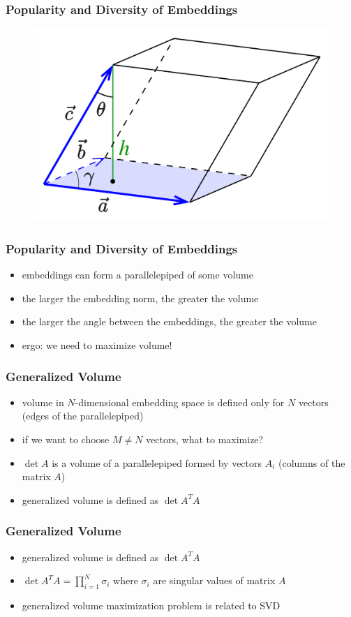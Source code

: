 \documentclass[t]{beamer}
\begin{document}
\begin{frame}
  \frametitle{Popularity and Diversity of Embeddings}
\begin{figure}
\includegraphics[scale=0.2]{parallelepiped}
\end{figure}
\end{frame}
\begin{frame}
  \frametitle{Popularity and Diversity of Embeddings}
  \begin{itemize}
  \item embeddings can form a parallelepiped of some volume
  \item the larger the embedding norm, the greater the volume
  \item the larger the angle between the embeddings, the greater the volume
  \item ergo: we need to maximize volume!
  \end{itemize}
\end{frame}
\begin{frame}
  \frametitle{Generalized Volume}
  \begin{itemize}
  \item volume in $N$-dimensional embedding space is defined only for $N$ vectors (edges of the parallelepiped)
  \item if we want to choose $M\ne N$ vectors, what to maximize?
  \item $\det A$ is a volume of a parallelepiped formed by vectors $A_i$ (columns of the matrix $A$)
  \item generalized volume is defined as $\det A^TA$
  \end{itemize}
\end{frame}
\begin{frame}
  \frametitle{Generalized Volume}
  \begin{itemize}
  \item generalized volume is defined as $\det A^TA$
  \item $\det A^TA=\prod\limits_{i=1}^N\sigma_i$ where $\sigma_i$ are singular values of matrix $A$
  \item generalized volume maximization problem is related to SVD  
  \end{itemize}
\end{frame}
\end{document}

